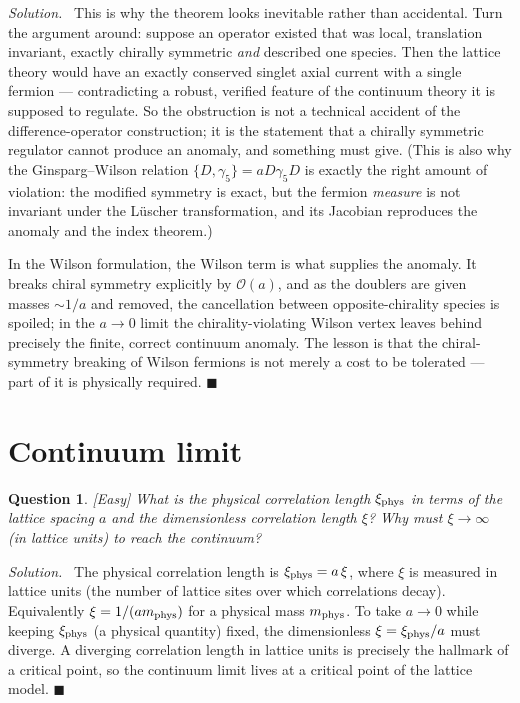 \documentclass[11pt]{article}
\newcommand{\diff}[1]{\textcolor{blue!60!black}{\footnotesize\textsf{[#1]}}\quad}
\newtheorem{question}{Question}
\newenvironment{solution}{\par\smallskip\noindent\textit{Solution.}\ }{\hfill$\blacksquare$\par\smallskip}
\begin{document}
\begin{solution}
This is why the theorem looks inevitable rather than accidental. Turn the argument around: suppose an operator existed that was local, translation invariant, exactly chirally symmetric \emph{and} described one species. Then the lattice theory would have an exactly conserved singlet axial current with a single fermion --- contradicting a robust, verified feature of the continuum theory it is supposed to regulate. So the obstruction is not a technical accident of the difference-operator construction; it is the statement that a chirally symmetric regulator cannot produce an anomaly, and something must give. (This is also why the Ginsparg--Wilson relation $\{D,\gamma_5\} = aD\gamma_5D$ is exactly the right amount of violation: the modified symmetry is exact, but the fermion \emph{measure} is not invariant under the L\"uscher transformation, and its Jacobian reproduces the anomaly and the index theorem.)

In the Wilson formulation, the Wilson term is what supplies the anomaly. It breaks chiral symmetry explicitly by $\mathcal{O}(a)$, and as the doublers are given masses $\sim 1/a$ and removed, the cancellation between opposite-chirality species is spoiled; in the $a\to0$ limit the chirality-violating Wilson vertex leaves behind precisely the finite, correct continuum anomaly. The lesson is that the chiral-symmetry breaking of Wilson fermions is not merely a cost to be tolerated --- part of it is physically required.
\end{solution}

\section{Continuum limit}

\begin{question}
\diff{Easy} What is the physical correlation length $\xi_{\rm phys}$ in terms of the lattice spacing $a$ and the dimensionless correlation length $\xi$? Why must $\xi \to \infty$ (in lattice units) to reach the continuum?
\end{question}
\begin{solution}
The physical correlation length is $\xi_{\rm phys} = a\,\xi$, where $\xi$ is measured in lattice units (the number of lattice sites over which correlations decay). Equivalently $\xi = 1/(a m_{\rm phys})$ for a physical mass $m_{\rm phys}$. To take $a\to 0$ while keeping $\xi_{\rm phys}$ (a physical quantity) fixed, the dimensionless $\xi = \xi_{\rm phys}/a$ must diverge. A diverging correlation length in lattice units is precisely the hallmark of a critical point, so the continuum limit lives at a critical point of the lattice model.
\end{solution}
\end{document}

